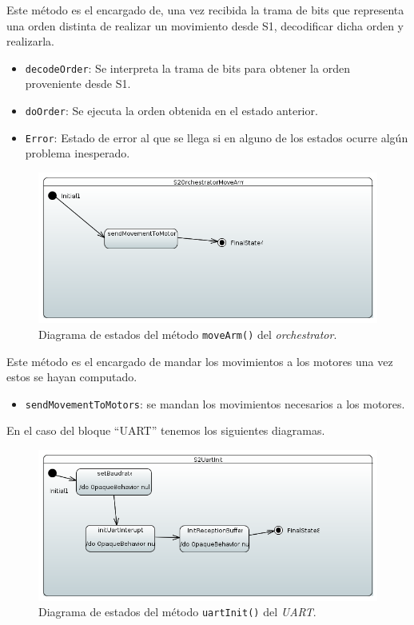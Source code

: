 Este método es el encargado de, una vez recibida la trama de bits que representa una orden distinta de realizar un movimiento desde S1, decodificar dicha orden y realizarla.

\begin{itemize}
    \item \texttt{decodeOrder}: Se interpreta la trama de bits para obtener la orden proveniente desde S1.
    \item \texttt{doOrder}: Se ejecuta la orden obtenida en el estado anterior.
    \item \texttt{Error}: Estado de error al que se llega si en alguno de los estados ocurre algún problema inesperado. 
\end{itemize}

\begin{figure}[H]
    \centering
    \includegraphics[width=1\linewidth]{pictures/S2OrchestratorMoveArm.PNG}
    \caption{Diagrama de estados del método \texttt{moveArm()} del \textit{orchestrator}.}
    \label{fig:fun_move_arm_orchestator}
\end{figure}

Este método es el encargado de mandar los movimientos a los motores una vez estos se hayan computado.

\begin{itemize}
    \item \texttt{sendMovementToMotors}: se mandan los movimientos necesarios a los motores.
    
\end{itemize}

En el caso del bloque “UART” tenemos los siguientes diagramas.

\begin{figure}[H]
    \centering
    \includegraphics[width=1\linewidth]{pictures/S2UartInit.PNG}
    \caption{Diagrama de estados del método \texttt{uartInit()} del \textit{UART}.}
    \label{fig:fun_uart_init_uart}
\end{figure}

